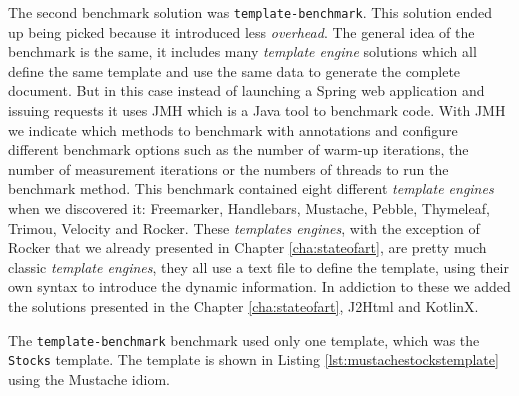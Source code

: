 The second benchmark solution was \texttt{template-benchmark}\cite{templatebenchmark}. This solution ended up being picked because it introduced less \textit{overhead}. The general idea of the benchmark is the same, it includes many \textit{template engine} solutions which all define the same template and use the same data to generate the complete document. But in this case instead of launching a Spring web application and issuing requests it uses \ac{JMH}\cite{jmh} which is a Java tool to benchmark code. With \ac{JMH} we indicate which methods to benchmark with annotations and configure different benchmark options such as the number of warm-up iterations, the number of measurement iterations or the numbers of threads to run the benchmark method. This benchmark contained eight different \textit{template engines} when we discovered it: Freemarker\cite{freemarker}, Handlebars\cite{handlebars}, Mustache\cite{mustache}, Pebble\cite{pebble}, Thymeleaf\cite{thymeleaf}, Trimou\cite{trimou}, Velocity\cite{velocity} and Rocker\cite{rocker}. These \textit{templates engines}, with the exception of Rocker that we already presented in Chapter \ref{cha:stateofart}, are pretty much classic \textit{template engines}, they all use a text file to define the template, using their own syntax to introduce the dynamic information. In addiction to these we added the solutions presented in the Chapter \ref{cha:stateofart}, J2Html and KotlinX. 

\noindent
The \texttt{template-benchmark} benchmark used only one template, which was the \texttt{Stocks} template. The template is shown in Listing \ref{lst:mustachestockstemplate} using the Mustache idiom.

\bigskip


